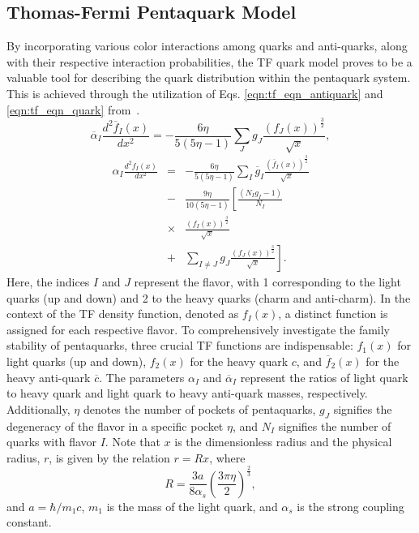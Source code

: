 \documentclass[final,3p,times,twocolumn]{elsarticle}
\begin{document}
    \subsection{Thomas-Fermi Pentaquark Model} \label{subsection:tfqm}
        By incorporating various color interactions among quarks and anti-quarks, along with their respective interaction probabilities, the TF quark model proves to be a valuable tool for describing the quark distribution within the pentaquark system. This is achieved through the utilization of Eqs. \eqref{eqn:tf_eqn_antiquark} and \eqref{eqn:tf_eqn_quark} from~\cite{giri2021investigation}.
        \begin{equation}
            \overline{\alpha}_I \frac{d^2\overline{f}_I(x)}{dx^2}= -\frac{6\eta}{5(5\eta-1)} \sum_J g_J \frac{(f_J(x))^\frac{3}{2}}{\sqrt{x}},
            \label{eqn:tf_eqn_antiquark}
        \end{equation} 
        \begin{eqnarray}
            \alpha_I \frac{d^2 f_I(x)}{dx^2} &=& -\frac{6\eta}{5(5\eta-1)}\sum_I \overline{g}_I \frac{\left( \overline{f}_I(x) \right)^\frac{3}{2}}{\sqrt{x}} \nonumber \\
            &-& \frac{9\eta}{10(5\eta-1)}\left[\frac{(N_I g_I-1)}{N_I} \right. \nonumber \\
            &\times&\frac{\left( f_I(x) \right)^\frac{3}{2}}{\sqrt{x}} \nonumber \\
             &+& \left. \sum_{I \ne J} g_J \frac{\left( f_J(x) \right)^\frac{3}{2}}{\sqrt{x}} \right].
            \label{eqn:tf_eqn_quark}
        \end{eqnarray}
        Here, the indices $I$ and $J$ represent the flavor, with 1 corresponding to the light quarks (up and down) and 2 to the heavy quarks (charm and anti-charm). In the context of the TF density function, denoted as $f_I(x)$, a distinct function is assigned for each respective flavor. To comprehensively investigate the family stability of pentaquarks, three crucial TF functions are indispensable: $f_1(x)$ for light quarks (up and down), $f_2(x)$ for the heavy quark $c$, and $\overline{f}_{2}(x)$ for the heavy anti-quark $\overline{c}$. The parameters $\alpha_I$ and $\overline{\alpha}_I$ represent the ratios of light quark to heavy quark and light quark to heavy anti-quark masses, respectively. Additionally, $\eta$ denotes the number of pockets of pentaquarks, $g_J$ signifies the degeneracy of the flavor in a specific pocket $\eta$, and $N_I$ signifies the number of quarks with flavor $I$. Note that $x$ is the dimensionless radius and the physical radius, $r$, is given by the relation  $r = Rx$, where  
        \begin{equation}
            R=\frac{3 a}{8\alpha_{s}}  \left(\frac{ 3 \pi \eta}{2} \right)^\frac{2}{3},
            \label{eqn:radius_constant}
        \end{equation}
        and $ a=\hbar / m_{1} c$, $m_{1}$ is the mass of the light quark, and $\alpha_{s}$ is the strong coupling constant.
        
\end{document}

